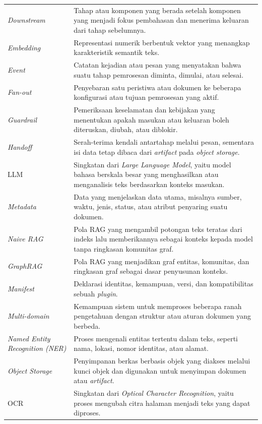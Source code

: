 \begin{longtable}{@{}>{\RaggedRight\arraybackslash}p{3.7cm}>{\RaggedRight\arraybackslash}p{\dimexpr\textwidth-3.7cm-2\tabcolsep\relax}@{}}
\textit{Downstream} & Tahap atau komponen yang berada setelah komponen yang menjadi fokus pembahasan dan menerima keluaran dari tahap sebelumnya. \\
\textit{Embedding} & Representasi numerik berbentuk vektor yang menangkap karakteristik semantik teks. \\
\textit{Event} & Catatan kejadian atau pesan yang menyatakan bahwa suatu tahap pemrosesan diminta, dimulai, atau selesai. \\
\textit{Fan-out} & Penyebaran satu peristiwa atau dokumen ke beberapa konfigurasi atau tujuan pemrosesan yang aktif. \\
\textit{Guardrail} & Pemeriksaan keselamatan dan kebijakan yang menentukan apakah masukan atau keluaran boleh diteruskan, diubah, atau diblokir. \\
\textit{Handoff} & Serah-terima kendali antartahap melalui pesan, sementara isi data tetap dibaca dari \textit{artifact} pada \textit{object storage}. \\
LLM & Singkatan dari \textit{Large Language Model}, yaitu model bahasa berskala besar yang menghasilkan atau menganalisis teks berdasarkan konteks masukan. \\
\textit{Metadata} & Data yang menjelaskan data utama, misalnya sumber, waktu, jenis, status, atau atribut penyaring suatu dokumen. \\
\textit{Naive RAG} & Pola RAG yang mengambil potongan teks teratas dari indeks lalu memberikannya sebagai konteks kepada model tanpa ringkasan komunitas graf. \\
\textit{GraphRAG} & Pola RAG yang menjadikan graf entitas, komunitas, dan ringkasan graf sebagai dasar penyusunan konteks. \\
\textit{Manifest} & Deklarasi identitas, kemampuan, versi, dan kompatibilitas sebuah \textit{plugin}. \\
\textit{Multi-domain} & Kemampuan sistem untuk memproses beberapa ranah pengetahuan dengan struktur atau aturan dokumen yang berbeda. \\
\textit{Named Entity Recognition (NER)} & Proses mengenali entitas tertentu dalam teks, seperti nama, lokasi, nomor identitas, atau alamat. \\
\textit{Object Storage} & Penyimpanan berkas berbasis objek yang diakses melalui kunci objek dan digunakan untuk menyimpan dokumen atau \textit{artifact}. \\
OCR & Singkatan dari \textit{Optical Character Recognition}, yaitu proses mengubah citra halaman menjadi teks yang dapat diproses. \\

\end{longtable}
